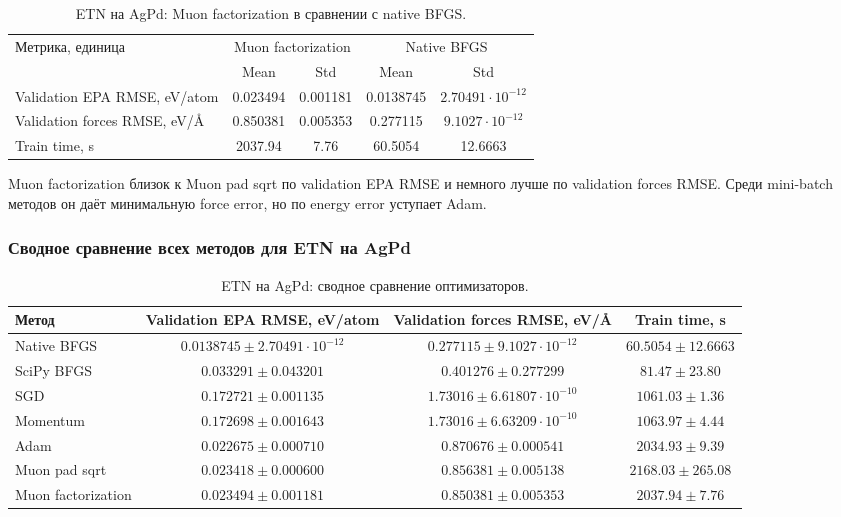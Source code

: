 \begin{table}[H]
\centering
\small
\caption{ETN на AgPd: Muon factorization в сравнении с native BFGS.}
\label{tab:etn-agpd-muon-factor}
\begin{tabular}{lcccc}
\toprule
\multirow{2}{*}{Метрика, единица} & \multicolumn{2}{c}{Muon factorization} & \multicolumn{2}{c}{Native BFGS} \\
\cmidrule(lr){2-3}\cmidrule(lr){4-5}
 & Mean & Std & Mean & Std \\
\midrule
Validation EPA RMSE, eV/atom & 0.023494 & 0.001181 & 0.0138745 & \(2.70491\cdot 10^{-12}\) \\
Validation forces RMSE, eV/\AA & 0.850381 & 0.005353 & 0.277115 & \(9.1027\cdot 10^{-12}\) \\
Train time, s & 2037.94 & 7.76 & 60.5054 & 12.6663 \\
\bottomrule
\end{tabular}
\end{table}


Muon factorization близок к Muon pad sqrt по validation EPA RMSE и немного лучше по validation forces RMSE. Среди mini-batch методов он даёт минимальную force error, но по energy error уступает Adam.

\FloatBarrier

\subsubsection{Сводное сравнение всех методов для ETN на AgPd}

\begin{table}[H]
\centering
\small
\caption{ETN на AgPd: сводное сравнение оптимизаторов.}
\label{tab:etn-agpd-summary}
\begingroup
\setlength{\tabcolsep}{2.5pt}
\begin{tabular}{@{}lccc@{}}
\toprule
Метод & Validation EPA RMSE, eV/atom & Validation forces RMSE, eV/\AA & Train time, s \\
\midrule
Native BFGS & \(0.0138745 \pm 2.70491\cdot 10^{-12}\) & \(0.277115 \pm 9.1027\cdot 10^{-12}\) & \(60.5054 \pm 12.6663\) \\
SciPy BFGS & \(0.033291 \pm 0.043201\) & \(0.401276 \pm 0.277299\) & \(81.47 \pm 23.80\) \\
SGD & \(0.172721 \pm 0.001135\) & \(1.73016 \pm 6.61807\cdot 10^{-10}\) & \(1061.03 \pm 1.36\) \\
Momentum & \(0.172698 \pm 0.001643\) & \(1.73016 \pm 6.63209\cdot 10^{-10}\) & \(1063.97 \pm 4.44\) \\
Adam & \(0.022675 \pm 0.000710\) & \(0.870676 \pm 0.000541\) & \(2034.93 \pm 9.39\) \\
Muon pad sqrt & \(0.023418 \pm 0.000600\) & \(0.856381 \pm 0.005138\) & \(2168.03 \pm 265.08\) \\
Muon factorization & \(0.023494 \pm 0.001181\) & \(0.850381 \pm 0.005353\) & \(2037.94 \pm 7.76\) \\
\bottomrule
\end{tabular}
\endgroup
\end{table}

